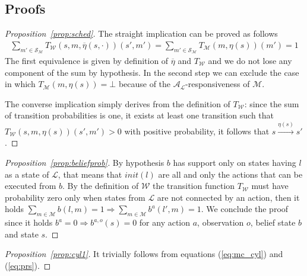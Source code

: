 \subsection*{Proofs} %
\label{sub:proofs}
\begin{proof}[Proposition~\ref{prop:sched}]
The straight implication can be proved as follows
\begin{align*}
	\sum_{m' \in \mathcal{S}_\mathcal{M}} T_{\mathcal{W}}(s,m,\overline\eta(s,\cdot))(s',m')
	= \sum_{m' \in \mathcal{S}_\mathcal{M}} T_{\mathcal{M}}(m,\eta(s))(m') = 1
\end{align*}
The first equivalence is given by definition of $\overline\eta$ and $T_\mathcal{W}$ and we do not lose any component of the sum by hypothesis. In the second step we can exclude the case in which $T_\mathcal{M}(m,\eta(s)) = \bot$ because of the $\mathcal{A}_\mathcal{L}$-responsiveness of $\mathcal{M}$.

The converse implication simply derives from the definition of $T_\mathcal{W}$: since the sum of transition probabilities is one, it exists at least one transition such that
$ T_\mathcal{W}(s,m,\eta(s))(s',m') > 0 $
with positive probability, it follows that $s \xrightarrow{\eta(s)} s'$.
\end{proof}
\begin{proof}[Proposition~\ref{prop:beliefprob}]
By hypothesis $b$ has support only on states having $l$ as a state of $\mathcal{L}$, that means that $init(l)$ are all and only the actions that can be executed from $b$. By the definition of $\mathcal{W}$ the transition function $T_\mathcal{W}$ must have probability zero only when states from $\mathcal{L}$ are not connected by an action, then it holds $ \sum_{m \in \mathcal{M}} b(l,m) = 1 \Rightarrow \sum_{m\in \mathcal{M}} b^a(l',m) = 1 $. We conclude the proof since it holds $b^a = 0 \Rightarrow b^{a,o}(s) = 0$ for any action $a$, observation $o$, belief state $b$ and state $s$.
\end{proof}
\begin{proof}[Proposition~\ref{prop:cyl1}]
It trivially follows from equations (\ref{eq:mc_cyl}) and (\ref{eq:prs}).
\end{proof}

